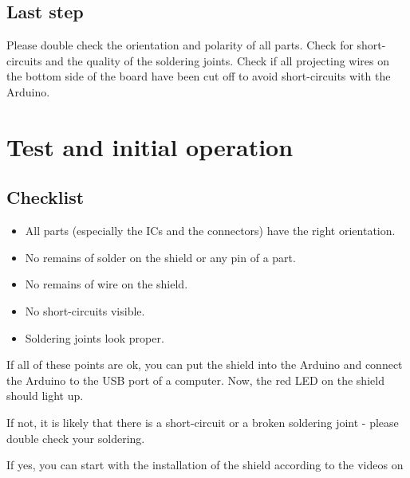 \documentclass[fleqn,10pt]{SelfArx} %
\begin{document}


\subsection*{Last step}

Please double check the orientation and polarity of all parts. Check for short-circuits and the quality of the soldering joints. Check if all projecting wires on the bottom side of the board have been cut off to avoid short-circuits with the Arduino.


\section{Test and initial operation}

\subsection*{Checklist}

\begin{itemize}[noitemsep] %
\item[\CheckedBox] All parts (especially the ICs and the connectors) have the right orientation.
\item[\CheckedBox] No remains of solder on the shield or any pin of a part.
\item[\CheckedBox] No remains of wire on the shield.
\item[\CheckedBox] No short-circuits visible.
\item[\CheckedBox] Soldering joints look proper.
\end{itemize}

If all of these points are ok, you can put the shield into the Arduino and connect the Arduino to the USB port of a computer. Now, the red LED on the shield should light up.

If not, it is likely that there is a short-circuit or a broken soldering joint - please double check your soldering.

If yes, you can start with the installation of the shield according to the videos on
\end{document}
